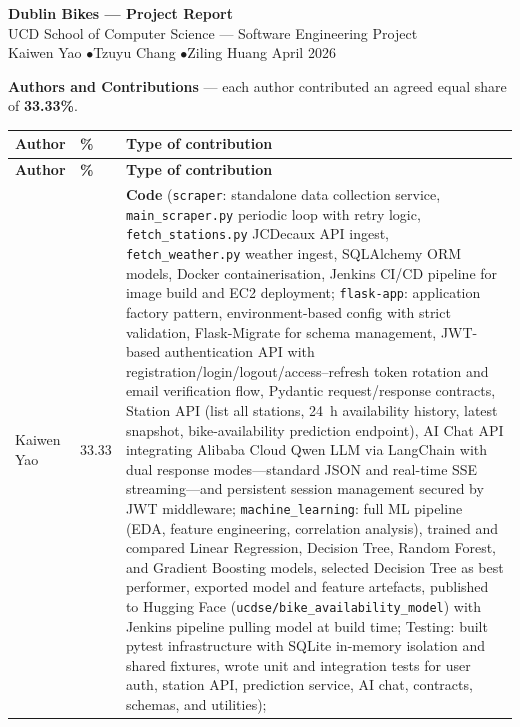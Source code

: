 \documentclass[11pt,a4paper]{article}
\begin{document}
\begin{center}
{\Large\textbf{Dublin Bikes --- Project Report}}\\[0.3em]
{\normalsize UCD School of Computer Science --- Software Engineering Project}\\[0.3em]
{\normalsize Kaiwen Yao \quad$\bullet$\quad Tzuyu Chang \quad$\bullet$\quad Ziling Huang \qquad April 2026}
\end{center}

\noindent\textbf{Authors and Contributions} --- each author contributed an agreed equal share of \textbf{33.33\%}.

\vspace{0.5em}

\small
\begin{longtable}{@{}p{2.2cm}p{1cm}p{11.5cm}@{}}
\toprule
\textbf{Author} & \textbf{\%} & \textbf{Type of contribution} \\
\midrule
\endfirsthead
\toprule
\textbf{Author} & \textbf{\%} & \textbf{Type of contribution} \\
\midrule
\endhead
\bottomrule
\endfoot
Kaiwen Yao & 33.33 & 
\textbf{Code} (\texttt{scraper}: standalone data collection service, \texttt{main\_scraper.py} periodic loop with retry logic, \texttt{fetch\_stations.py} JCDecaux API ingest, \texttt{fetch\_weather.py} weather ingest, SQLAlchemy ORM models, Docker containerisation, Jenkins CI/CD pipeline for image build and EC2 deployment; \texttt{flask-app}: application factory pattern, environment-based config with strict validation, Flask-Migrate for schema management, JWT-based authentication API with registration/login/logout/access--refresh token rotation and email verification flow, Pydantic request/response contracts, Station API (list all stations, 24~h availability history, latest snapshot, bike-availability prediction endpoint), AI Chat API integrating Alibaba Cloud Qwen LLM via LangChain with dual response modes---standard JSON and real-time SSE streaming---and persistent session management secured by JWT middleware; \texttt{machine\_learning}: full ML pipeline (EDA, feature engineering, correlation analysis), trained and compared Linear Regression, Decision Tree, Random Forest, and Gradient Boosting models, selected Decision Tree as best performer, exported model and feature artefacts, published to Hugging Face (\texttt{ucdse/bike\_availability\_model}) with Jenkins pipeline pulling model at build time; Testing: built pytest infrastructure with SQLite in-memory isolation and shared fixtures, wrote unit and integration tests for user auth, station API, prediction service, AI chat, contracts, schemas, and utilities); 

\end{longtable}
\end{document}
